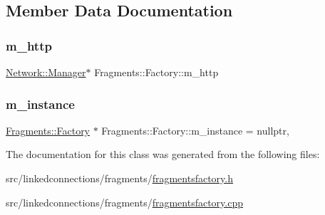 \subsection{Member Data Documentation}
\mbox{\label{classFragments_1_1Factory_aa98b2097fdc55511bdf4fc3bda37e98e}} 
\subsubsection{\texorpdfstring{m\+\_\+http}{m\_http}}
{\footnotesize\ttfamily \mbox{\hyperlink{classNetwork_1_1Manager}{Network\+::\+Manager}}$\ast$ Fragments\+::\+Factory\+::m\+\_\+http\hspace{0.3cm}{\ttfamily [private]}}

\mbox{\label{classFragments_1_1Factory_a7e07aaa093813ab0e1cb50e92ac1386e}} 
\subsubsection{\texorpdfstring{m\+\_\+instance}{m\_instance}}
{\footnotesize\ttfamily \mbox{\hyperlink{classFragments_1_1Factory}{Fragments\+::\+Factory}} $\ast$ Fragments\+::\+Factory\+::m\+\_\+instance = nullptr\hspace{0.3cm}{\ttfamily [static]}, {\ttfamily [private]}}



The documentation for this class was generated from the following files\+:\begin{DoxyCompactItemize}
\item 
src/linkedconnections/fragments/\mbox{\hyperlink{fragmentsfactory_8h}{fragmentsfactory.\+h}}\item 
src/linkedconnections/fragments/\mbox{\hyperlink{fragmentsfactory_8cpp}{fragmentsfactory.\+cpp}}\end{DoxyCompactItemize}
